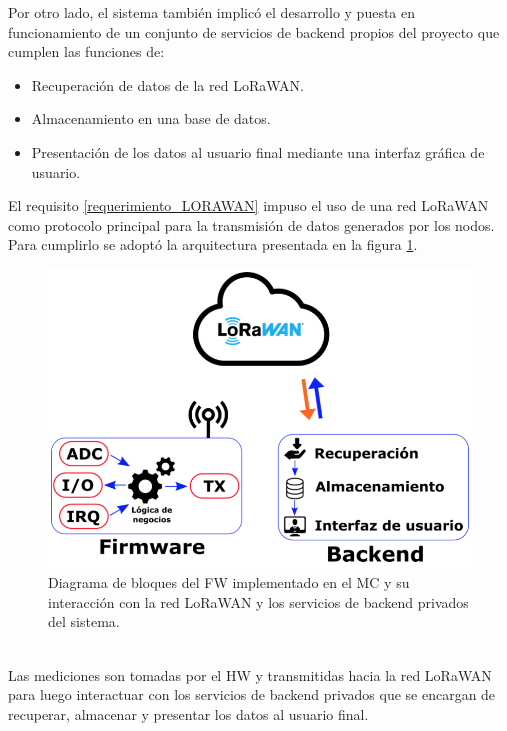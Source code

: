 Por otro lado, el sistema también implicó el desarrollo y puesta en funcionamiento de un conjunto de servicios de backend propios del proyecto que cumplen las funciones de:
\begin{itemize}
	\item Recuperación de datos de la red LoRaWAN.
	\item Almacenamiento en una base de datos.
	\item Presentación de los datos al usuario final mediante una interfaz gráfica de usuario.
\end{itemize}

El requisito \ref{requerimiento_LORAWAN} impuso el uso de una red LoRaWAN como protocolo principal para la transmisión de datos generados por los nodos. Para cumplirlo se adoptó la arquitectura presentada en la figura \ref{fig:diagramadebloquesdebes}.\\
\begin{figure}[h!]
	\centering
	\includegraphics[width=0.8\linewidth]{Figures/diagrama_de_bloques_de_BES}
	\caption{Diagrama de bloques del FW implementado en el MC y su interacción con la red LoRaWAN y los servicios de backend privados del sistema.}
	\label{fig:diagramadebloquesdebes}
\end{figure}\\
Las mediciones son tomadas por el HW y transmitidas hacia la red LoRaWAN para luego interactuar con los servicios de backend privados que se encargan de recuperar, almacenar y presentar los datos al usuario final.\\


